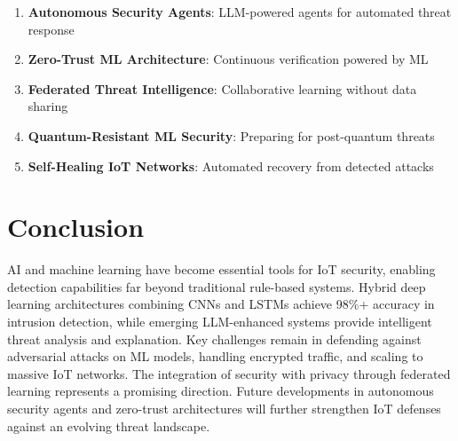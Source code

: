 \documentclass[12pt,a4paper]{article}
\begin{document}
\begin{enumerate}
    \item \textbf{Autonomous Security Agents}: LLM-powered agents for automated threat response
    \item \textbf{Zero-Trust ML Architecture}: Continuous verification powered by ML
    \item \textbf{Federated Threat Intelligence}: Collaborative learning without data sharing
    \item \textbf{Quantum-Resistant ML Security}: Preparing for post-quantum threats
    \item \textbf{Self-Healing IoT Networks}: Automated recovery from detected attacks
\end{enumerate}

\section{Conclusion}

AI and machine learning have become essential tools for IoT security, enabling detection capabilities far beyond traditional rule-based systems. Hybrid deep learning architectures combining CNNs and LSTMs achieve 98\%+ accuracy in intrusion detection, while emerging LLM-enhanced systems provide intelligent threat analysis and explanation. Key challenges remain in defending against adversarial attacks on ML models, handling encrypted traffic, and scaling to massive IoT networks. The integration of security with privacy through federated learning represents a promising direction. Future developments in autonomous security agents and zero-trust architectures will further strengthen IoT defenses against an evolving threat landscape.
\end{document}
